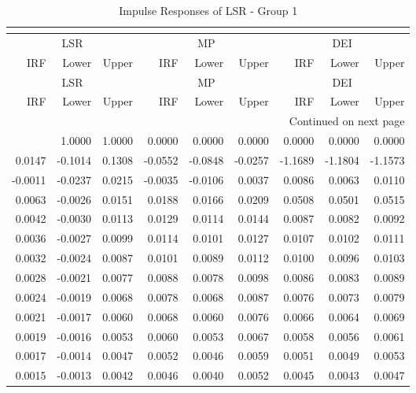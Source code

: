\begin{longtable}{rrrrrrrrr}
\caption{Impulse Responses of LSR - Group 1}\\
\label{tab:lsr_irf_group1}\\
\toprule
\multicolumn{3}{c}{LSR} & \multicolumn{3}{c}{MP} & \multicolumn{3}{c}{DEI} \\
IRF & Lower & Upper & IRF & Lower & Upper & IRF & Lower & Upper \\
\midrule
\endfirsthead
\toprule
\multicolumn{3}{c}{LSR} & \multicolumn{3}{c}{MP} & \multicolumn{3}{c}{DEI} \\
IRF & Lower & Upper & IRF & Lower & Upper & IRF & Lower & Upper \\
\midrule
\endhead
\midrule
\multicolumn{9}{r}{Continued on next page} \\
\midrule
\endfoot
\bottomrule
\endlastfoot
1.0000 & 1.0000 & 1.0000 & 0.0000 & 0.0000 & 0.0000 & 0.0000 & 0.0000 & 0.0000 \\
0.0147 & -0.1014 & 0.1308 & -0.0552 & -0.0848 & -0.0257 & -1.1689 & -1.1804 & -1.1573 \\
-0.0011 & -0.0237 & 0.0215 & -0.0035 & -0.0106 & 0.0037 & 0.0086 & 0.0063 & 0.0110 \\
0.0063 & -0.0026 & 0.0151 & 0.0188 & 0.0166 & 0.0209 & 0.0508 & 0.0501 & 0.0515 \\
0.0042 & -0.0030 & 0.0113 & 0.0129 & 0.0114 & 0.0144 & 0.0087 & 0.0082 & 0.0092 \\
0.0036 & -0.0027 & 0.0099 & 0.0114 & 0.0101 & 0.0127 & 0.0107 & 0.0102 & 0.0111 \\
0.0032 & -0.0024 & 0.0087 & 0.0101 & 0.0089 & 0.0112 & 0.0100 & 0.0096 & 0.0103 \\
0.0028 & -0.0021 & 0.0077 & 0.0088 & 0.0078 & 0.0098 & 0.0086 & 0.0083 & 0.0089 \\
0.0024 & -0.0019 & 0.0068 & 0.0078 & 0.0068 & 0.0087 & 0.0076 & 0.0073 & 0.0079 \\
0.0021 & -0.0017 & 0.0060 & 0.0068 & 0.0060 & 0.0076 & 0.0066 & 0.0064 & 0.0069 \\
0.0019 & -0.0016 & 0.0053 & 0.0060 & 0.0053 & 0.0067 & 0.0058 & 0.0056 & 0.0061 \\
0.0017 & -0.0014 & 0.0047 & 0.0052 & 0.0046 & 0.0059 & 0.0051 & 0.0049 & 0.0053 \\
0.0015 & -0.0013 & 0.0042 & 0.0046 & 0.0040 & 0.0052 & 0.0045 & 0.0043 & 0.0047 \\
\end{longtable}